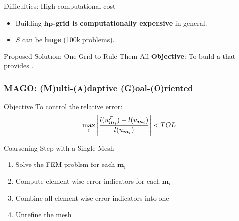 \documentclass[10pt,aspectratio=149]{beamer}
\begin{document}
\begin{frame}
\begin{block}{Difficulties: High computational cost}
    	\begin{itemize}
		\item Building \textbf{$\boldsymbol{hp}$-grid is computationally expensive} in general.
		\item $S$ can be \textbf{huge} (100k problems).
	\end{itemize}
 \end{block}

	\vspace{1mm}

\begin{block}{Proposed Solution: One Grid to Rule Them All}
	    \textbf{Objective}: To build a  that provides .
	  \end{block}


\end{frame}
\begin{frame}
	\frametitle{MAGO: (M)ulti-(A)daptive (G)oal-(O)riented}
	
	\vspace{-1mm}
\begin{block}{Objective}
	To control the relative error:
	\begin{equation}
   		\max_i{\left| \frac{l(u_{\boldsymbol{m}_i}^{\mathcal{F}}) - l(u_{\boldsymbol{m}_i})}{l(u_{\boldsymbol{m}_i})}\right| }< TOL
	\end{equation}
\end{block}

\vspace{1mm}

\begin{block}{Coarsening Step with a Single Mesh}
	\vspace{2mm}
	\begin{enumerate}
		\item Solve the FEM problem for each $\boldsymbol{m}_i$
		\item Compute element-wise error indicators for each $\boldsymbol{m}_i$
		\item Combine all element-wise error indicators into one
		\item Unrefine the mesh
	\end{enumerate}
\end{block}

\end{frame}
\end{document}
